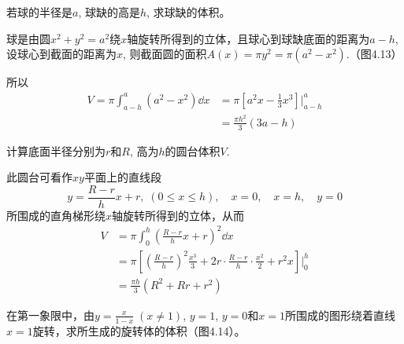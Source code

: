 \begin{example}
若球的半径是$a$, 球缺的高是$h$, 求球缺的体积。
\end{example}

\begin{figure}[htp]
    \centering
{}
    \caption{}
\end{figure}


\begin{solution}
球是由圆$x^2+y^2=a^2$绕$x$轴旋转所得到的立体，且球心到球缺底面的距离为$a-h$, 设球心到截面的距离为$x$, 则截面圆的面积$A (x) =\pi y^2=\pi  (a^2-x^2)$.（图4.13）

所以
\[\begin{split}
    V=\pi\int^a_{a-h}(a^2-x^2)\dd x&=\pi\left[a^2 x-\frac{1}{3}x^3\right]\Bigg|^a_{a-h}\\
    &=\frac{\pi h^2}{3}(3a-h)
\end{split} \]
\end{solution}

\begin{example}
    计算底面半径分别为$r$和$R$, 高为$h$的圆台体积$V$.
\end{example}

\begin{solution}
此圆台可看作$xy$平面上的直线段
\[y=\frac{R-r}{h}x+r,\; (0\le x\le h),\quad x=0,\quad x=h,\quad y=0\]
所围成的直角梯形绕$x$轴旋转所得到的立体，从而
\[\begin{split}
    V&=\pi\int^h_0 \left(\frac{R-r}{h}x+r\right)^2 \dd x\\
    &=\pi\left[\left(\frac{R-r}{h}\right)^2\frac{x^3}{3}+2r\cdot \frac{R-r}{h}\cdot \frac{x^2}{2}+r^2 x\right]\Bigg|^h_0\\
    &=\frac{\pi h}{3}(R^2+Rr+r^2)
\end{split}\]
\end{solution}

\begin{example}
在第一象限中，由$y=\frac{x}{1-x}\; (x\ne 1)$, $y=1$, $y=0$和$x=1$所围成的图形绕着直线$x=1$旋转，求所生成的旋转体的体积（图4.14）。
\end{example}


